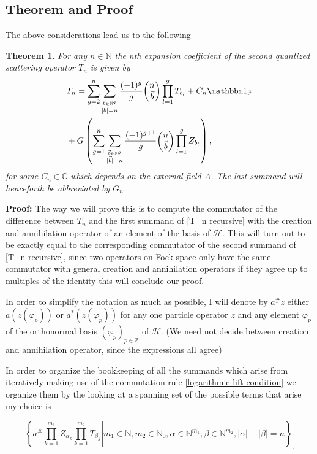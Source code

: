 \documentclass[b5paper,draft,openbib,12pt]{memoir}
\newtheorem{Thm}[Def]{Theorem}
\newcommand{\id}{{\mathbbm 1}}
\begin{document}
\subsection{Theorem and Proof}

The above considerations lead us to the following

\begin{Thm}\label{thm: T_n recursive}
For any \(n\in\mathbb{N}\) the nth expansion coefficient of the second quantized scattering operator \(T_n\) is given by
\begin{align}\notag
&T_n = \sum_{g=2}^n \sum_{\stackrel{\vec{b}\in\mathbb{N}^g}{|\vec{b}|=n}}\frac{(-1)^g}{g} 
\binom{n}{\vec{b}} \prod_{l=1}^g T_{b_l} + C_n \id_{\mathcal{F}} \\ \label{T_n recursive}
&+ G\left( \sum_{g=1}^n \sum_{\stackrel{\vec{b}\in\mathbb{N}^g}{|\vec{b}|=n}}\frac{(-1)^{g+1}}{g} 
\binom{n}{\vec{b}} \prod_{l=1}^g Z_{b_l}  \right),
\end{align}
for some \(C_n\in \mathbb{C}\) which depends on the external field \(A\). The last summand will henceforth
be abbreviated by \(G_n\).
\end{Thm}

\textbf{Proof:} The way we will prove this is to compute the commutator of the difference between \(T_n\) and
the first summand of \eqref{T_n recursive} with the creation and annihilation operator of an element of the
basis of \(\mathcal{H}\). This will turn out to be exactly equal
to the corresponding commutator
of the second summand of \eqref{T_n recursive}, since two operators on Fock space only
have the same commutator with general creation and annihilation operators if they
agree up to multiples of the identity this will conclude our proof. 

 In order to simplify the notation as much as possible, 
I will denote by \(a^\# z\) either \(a(z(\varphi_p))\) or
 \(a^*(z(\varphi_p))\) for any one particle operator \(z\) and any element
 \(\varphi_p\) of the orthonormal basis \((\varphi_p)_{p\in\mathbb{Z}}\) of
 \(\mathcal{H}\). (We need not decide between creation and annihilation 
 operator, since the expressions all agree)
 
In order to organize the bookkeeping of all the summands which arise from iteratively
making use of the commutation rule \eqref{logarithmic lift condition} we organize them 
by the looking at a spanning set of the possible terms that arise my choice is

\begin{equation}\label{combinatorics span}
\left\{ \left. a^\# \prod_{k=1}^{m_1} Z_{\alpha_k} \prod_{k=1}^{m_2}T_{\beta_k} \right|
m_1\in\mathbb{N},m_2\in\mathbb{N}_0, \alpha\in \mathbb{N}^{m_1}, 
\beta \in \mathbb{N}^{m_2}, |\alpha|+|\beta|=n\right\}_.
\end{equation}
\end{document}
